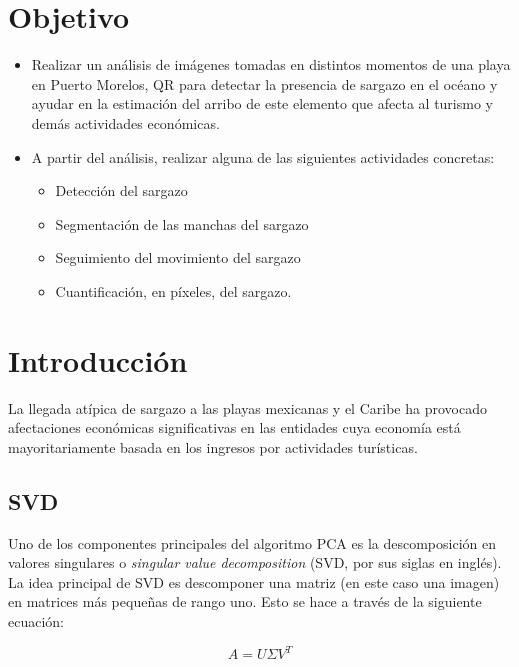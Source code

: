 \documentclass[conference]{IEEEtran}
\begin{document}
\section{Objetivo}
\begin{itemize}
    \item Realizar un análisis de imágenes tomadas en distintos momentos de una playa en Puerto Morelos, QR para detectar la presencia de sargazo en el océano y ayudar en la estimación del arribo de este elemento que afecta al turismo y demás actividades económicas.
    \item A partir del análisis, realizar alguna de las siguientes actividades concretas:
    \begin{itemize}
        \item Detección del sargazo
        \item Segmentación de las manchas del sargazo
        \item Seguimiento del movimiento del sargazo
        \item Cuantificación, en píxeles, del sargazo.
    \end{itemize}
\end{itemize}

\section{Introducción}

La llegada atípica de sargazo a las playas mexicanas y el Caribe ha provocado afectaciones económicas significativas en las entidades cuya economía está mayoritariamente basada en los ingresos por actividades turísticas. 

\subsection{SVD}
Uno de los componentes principales del algoritmo PCA es la descomposición en valores singulares o \textit{singular value decomposition} (SVD, por sus siglas en inglés). La idea principal de SVD es descomponer una matriz (en este caso una imagen) en matrices más pequeñas de rango uno. Esto se hace a través de la siguiente ecuación: 

\begin{equation} \label{eq:svd}
    A = U\Sigma V^T
\end{equation}
\end{document}
